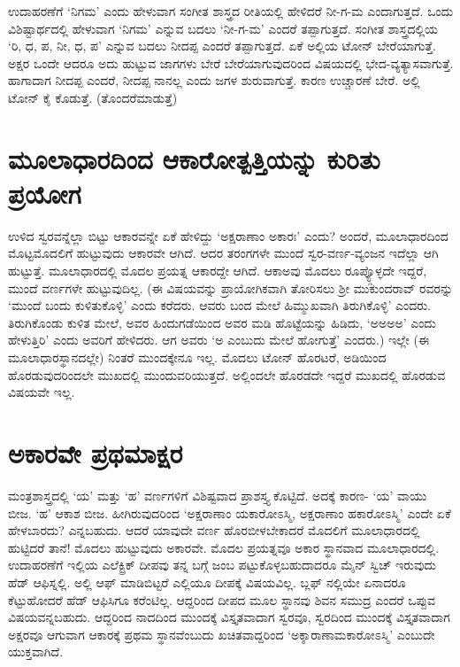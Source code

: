 ಉದಾಹರಣೆಗೆ `ನಿಗಮ' ಎಂದು ಹೇಳುವಾಗ ಸಂಗೀತ ಶಾಸ್ತ್ರದ ರೀತಿಯಲ್ಲಿ ಹೇಳಿದರೆ ನೀ-ಗ-ಮ ಎಂದಾಗುತ್ತದೆ. ಒಂದು ವಿಶಿಷ್ಟಾರ್ಥದಲ್ಲಿ ಹೇಳುವಾಗ `ನಿಗಮ' ಎನ್ನುವ ಬದಲು `ನೀ-ಗ-ಮ' ಎಂದರೆ ತಪ್ಪಾಗುತ್ತದೆ. ಸಂಗೀತ ಶಾಸ್ತ್ರದಲ್ಲಿಯ `ರಿ, ಧ, ಪ, ನೀ, ಧ, ಪ' ಎನ್ನುವ ಬದಲು ನೀದಪ್ಪ ಎಂದರೆ ತಪ್ಪಾಗುತ್ತದೆ. ಏಕೆ ಅಲ್ಲಿಯ ಟೋನ್ ಬೇರೆಯಾಗುತ್ತೆ. ಅಕ್ಷರ ಒಂದೇ ಆದರೂ ಅದು ಹುಟ್ಟುವ ಜಾಗಗಳು ಬೇರೆ ಬೇರೆಯಾಗುವುದರಿಂದ ವಿಷಯದಲ್ಲಿ ಭೇದ-ವ್ಯತ್ಯಾಸವಾಗುತ್ತೆ. ಹಾಗಾದಾಗ ನೀದಪ್ಪ ಎಂದರೆ, ನೀದಪ್ಪ ನಾನಲ್ಲ ಎಂದು ಜಗಳ ಶುರುವಾಗುತ್ತೆ. ಕಾರಣ ಉಚ್ಚಾರಣೆ ಬೇರೆ. ಅಲ್ಲಿ ಟೋನ್ ಕೈ ಕೊಡುತ್ತೆ. (ತೊಂದರೆಮಾಡುತ್ತೆ)

\section*{ಮೂಲಾಧಾರದಿಂದ ಆಕಾರೋತ್ಪತ್ತಿಯನ್ನು ಕುರಿತು ಪ್ರಯೋಗ} 

ಉಳಿದ ಸ್ವರವನ್ನೆಲ್ಲಾ ಬಿಟ್ಟು ಆಕಾರವನ್ನೇ ಏಕೆ ಹೇಳಿದ್ದು `ಅಕ್ಷರಾಣಾಂ ಅಕಾರಃ' ಎಂದು? ಅಂದರೆ, ಮೂಲಾಧಾರದಿಂದ ಮೊಟ್ಟಮೊದಲಿಗೆ ಹುಟ್ಟುವುದು ಆಕಾರವೇ ಆಗಿದೆ. ಆದರ ತರಂಗಗಳೇ ಮುಂದೆ ಸ್ವರ-ವರ್ಣ-ವ್ಯಂಜನ ಇದೆಲ್ಲಾ ಆಗಿ ಹುಟ್ಟುತ್ತೆ. ಮೂಲಾಧಾರದಲ್ಲಿ ಮೊದಲ ಪ್ರಯತ್ನ ಆಕಾರದ್ದೇ ಆಗಿದೆ. ಆಕಾಅವು ಮೊದಲು ರೂಪ್ಯ್ಗೊಳ್ಳದೇ ಇದ್ದರೆ, ಮುಂದೆ ವರ್ಣಗಳೇ ಹುಟ್ಟುವುದಿಲ್ಲ. (ಈ ವಿಷಯವನ್ನು ಪ್ರಾಯೋಗಿಕವಾಗಿ ತೋರಿಸಲು ಶ್ರೀ ಮುಕುಂದರಾವ್ ರವರನ್ನು `ಮುಂದೆ ಬಂದು ಕುಳಿತುಕೊಳ್ಳಿ' ಎಂದು ಕರೆದರು. ಆವರು ಬಂದ ಮೇಲೆ ಹಿಮ್ಮುಖವಾಗಿ ತಿರುಗಿಕೊಳ್ಳಿ' ಎಂದರು. ತಿರುಗಿಕೊಂಡು ಕುಳಿತ ಮೇಲೆ, ಅವರ ಹಿಂದುಗಡೆಯಿಂದ ಅವರ ಮಡಿ ಹೊಟ್ಟೆಯನ್ನು ಹಿಡಿದು, `ಅ‌ಅಅ‌ಅ' ಎಂದು ಹೇಳುತ್ತಿರಿ' ಎಂದು ಅವರಿಗೆ ಹೇಳಿದರು. ಆಗ ಅವರು `ಅ ಎಂಬುದು ಮೇಲೆ ಹೋಗುತ್ತೆ' ಎಂದರು.) ಇಲ್ಲೇ (ಈ ಮೂಲಾಧಾರಸ್ಥಾನದಲ್ಲೇ) ನಿಂತರೆ ಮುಂದಕ್ಕೇನೂ ಇಲ್ಲ. ಮೊದಲು ಟೋನ್ ಹೊರಟರೆ, ಅಡಿಯಿಂದ ಹೊರಡುವುದರಿಂದಲೇ ಮುಖದಲ್ಲಿ ಮುಂದುವರಿಯುತ್ತದೆ. ಅಲ್ಲಿಂದಲೇ ಹೊರಡದೇ ಇದ್ದರೆ ಮುಖದಲ್ಲಿ ಹೊರಡುವ ವಿಷಯವೇ ಇಲ್ಲ.

\section*{ಅಕಾರವೇ ಪ್ರಥಮಾಕ್ಷರ}

ಮಂತ್ರಶಾಸ್ತ್ರದಲ್ಲಿ `ಯ' ಮತ್ತು `ಹ' ವರ್ಣಗಳಿಗೆ ವಿಶಿಷ್ಟವಾದ ಪ್ರಾಶಸ್ತ್ಯ ಕೊಟ್ಟಿದೆ. ಅದಕ್ಕೆ ಕಾರಣ- `ಯ' ವಾಯು ಬೀಜ. `ಹ' ಆಕಾಶ ಬೀಜ. ಹೀಗಿರುವುದರಿಂದ `ಅಕ್ಷರಾಣಾಂ ಯಕಾರೋಽಸ್ಮಿ, ಅಕ್ಷರಾಣಾಂ ಹಕಾರೋಽಸ್ಮಿ' ಎಂದೇ ಏಕೆ ಹೇಳಬಾರದು? ಎನ್ನಬಹುದು. ಆದರೆ ಯಾವುದೇ ವರ್ಣ ಹೊರಬೀಳಬೇಕಾದರೆ ಮೊದಲಿಗೆ ಮೂಲಾಧಾರದಲ್ಲಿ ಹುಟ್ಟಿದರೆ ತಾನೆ! ಮೊದಲು ಹುಟ್ಟುವುದು ಅಕಾರವೇ. ಮೊದಲ ಪ್ರಯತ್ನವೂ ಅಕಾರ ಸ್ಥಾನವಾದ ಮೂಲಾಧಾರದಲ್ಲಿ. ಉದಾಹರಣೆಗೆ ಇಲ್ಲಿಯ ಎಲೆಕ್ಟ್ರಿಕ್ ದೀಪವು ತನ್ನ ಬಗ್ಗೆ ಜಂಬ ಪಟ್ಟುಕೊಳ್ಳಬಹುದಾದರೂ ಮೈನ್ ಸ್ವಿಚ್ ಇರುವುದು ಹೆಡ್ ಆಫಿಸ್ನಲ್ಲಿ. ಅಲ್ಲಿ ಆಫ್ ಮಾಡಿಬಿಟ್ಟರೆ ಎಲ್ಲಿಯೂ ದೀಪಕ್ಕೆ ವಿಷಯವಿಲ್ಲ. ಬ್ಲಫ್ ನಲ್ಲಿಯೇ ಏನಾದರೂ ಕೆಟ್ಟುಹೋದರೆ ಹೆಡ್ ಆಫಿಸಿಗೂ ಕರೆಂಟಿಲ್ಲ. ಆದ್ದರಿಂದ ದೀಪದ ಮೂಲ ಸ್ಥಾನವು ಶಿವನ ಸಮುದ್ರ ಎಂದರೆ ಒಪ್ಪುವ ವಿಷಯವನ್ನಬಹುದು. ಆದ್ದರಿಂದ ನಾದದಿಂದ ಮುಂದಕ್ಕೆ ವಿಸ್ತೃತವಾದಾಗ ಸ್ವರವೂ, ಸ್ವರದಿಂದ ಮುಂದಕ್ಕೆ ವಿಸ್ತೃತವಾದಾಗ ಅಕ್ಷರವೂ ಆಗುವಾಗ ಆಕಾರಕ್ಕೆ ಪ್ರಥಮ ಸ್ಥಾನವೆಂಬುದು ಖಚಿತವಾದ್ದರಿಂದ `ಅಕ್ಶಾರಾಣಾಮಕಾರೋಽಸ್ಮಿ' ಎಂಬುದೇ ಯುಕ್ತವಾಗಿದೆ.

